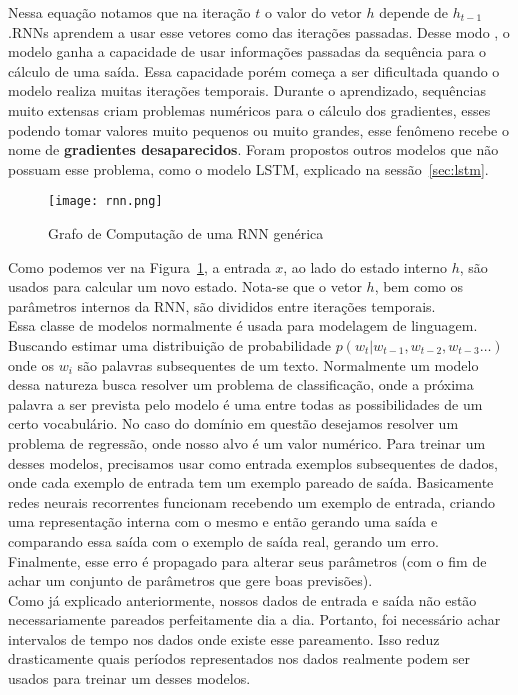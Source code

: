 Nessa equação notamos que na iteração $t$ o valor do vetor $h$ depende de
$h_{t-1}$.RNNs aprendem a usar esse vetores como
 das iterações passadas. Desse modo , o modelo ganha a capacidade
de usar informações passadas da sequência para o cálculo
de uma saída. Essa capacidade porém começa a ser dificultada quando o modelo
realiza muitas iterações temporais. Durante o aprendizado, sequências muito
extensas criam problemas numéricos para o cálculo dos gradientes, esses podendo
tomar valores muito pequenos ou muito grandes, esse fenômeno recebe o nome de
\textbf{gradientes desaparecidos}. Foram propostos outros modelos
que não possuam esse problema, como o modelo LSTM, explicado na sessão~\ref{sec:lstm}. 

\begin{figure}[H]
\centering
\texttt{[image: rnn.png]}
\caption{Grafo de Computação de uma RNN genérica \citep{dlbook}}
\label{fig:rnngraph}
\end{figure}

Como podemos ver na Figura~\ref{fig:rnngraph}, a entrada $x$, ao lado do estado
interno $h$, são usados para calcular um novo estado. Nota-se que o vetor $h$,
bem como os parâmetros internos da RNN, são divididos entre iterações temporais.
\\

Essa classe de modelos normalmente é usada para modelagem de linguagem. Buscando
estimar uma distribuição de probabilidade $p(w_t | w_{t-1},w_{t-2},w_{t-3} \dots
) $ onde os $w_i$ são palavras subsequentes de um texto. Normalmente um modelo
dessa natureza busca resolver um problema de classificação, onde a próxima palavra
a ser prevista pelo modelo é uma entre todas as possibilidades de um certo
vocabulário. No caso do domínio em questão desejamos resolver um problema de
regressão, onde nosso alvo é um valor numérico. Para treinar um desses modelos,
precisamos usar como entrada exemplos subsequentes de dados, onde cada exemplo
de entrada tem um exemplo pareado de saída. Basicamente redes neurais
recorrentes funcionam recebendo um exemplo de entrada, criando uma representação
interna com o mesmo e então gerando uma saída e comparando essa saída com o
exemplo de saída real, gerando um erro. Finalmente, esse erro é propagado para
alterar seus parâmetros (com o fim de achar um conjunto de parâmetros que gere
boas previsões). \\ 


Como já explicado anteriormente, nossos dados de entrada e saída não estão necessariamente pareados perfeitamente dia a dia. Portanto, foi necessário achar intervalos de tempo nos dados onde existe esse pareamento. Isso reduz drasticamente quais períodos representados nos dados realmente podem ser usados para treinar um desses modelos.


